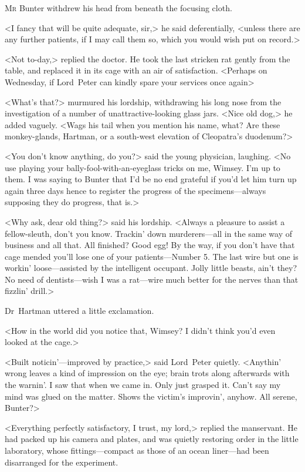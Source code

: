 
\lettrine[lines=4]{M}{r} Bunter withdrew his head from beneath the focusing cloth.

\zz
<I fancy that will be quite adequate, sir,> he said deferentially, <unless there are any further patients, if I may call them so, which you would wish put on record.>

<Not to-day,> replied the doctor. He took the last stricken rat gently from the table, and replaced it in its cage with an air of satisfaction. <Perhaps on Wednesday, if Lord~Peter can kindly spare your services once again\longdash>

<What's that?> murmured his lordship, withdrawing his long nose from the investigation of a number of unattractive-looking glass jars. <Nice old dog,> he added vaguely. <Wags his tail when you mention his name, what? Are these monkey-glands, Hartman, or a south-west elevation of Cleopatra's duodenum?>

<You don't know anything, do you?> said the young physician, laughing. <No use playing your bally-fool-with-an-eyeglass tricks on me, Wimsey. I'm up to them. I was saying to Bunter that I'd be no end grateful if you'd let him turn up again three days hence to register the progress of the specimens—always supposing they do progress, that is.>

<Why ask, dear old thing?> said his lordship. <Always a pleasure to assist a fellow-sleuth, don't you know. Trackin' down murderers—all in the same way of business and all that. All finished? Good egg! By the way, if you don't have that cage mended you'll lose one of your patients—Number 5. The last wire but one is workin' loose—assisted by the intelligent occupant. Jolly little beasts, ain't they? No need of dentists—wish I was a rat—wire much better for the nerves than that fizzlin' drill.>

Dr~Hartman uttered a little exclamation.

<How in the world did you notice that, Wimsey? I didn't think you'd even looked at the cage.>

<Built noticin'—improved by practice,> said Lord~Peter quietly. <Anythin' wrong leaves a kind of impression on the eye; brain trots along afterwards with the warnin'. I saw that when we came in. Only just grasped it. Can't say my mind was glued on the matter. Shows the victim's improvin', anyhow. All serene, Bunter?>

<Everything perfectly satisfactory, I trust, my lord,> replied the manservant. He had packed up his camera and plates, and was quietly restoring order in the little laboratory, whose fittings—compact as those of an ocean liner—had been disarranged for the experiment.

